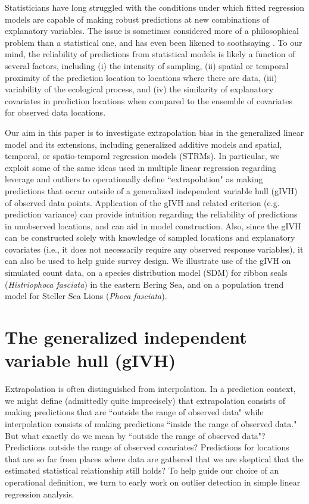 \documentclass[12pt,english]{article}
\begin{document}
\begin{spacing}{1.9}
Statisticians have long struggled with the conditions under which fitted regression models are capable of
making robust predictions at new combinations of explanatory variables.  The issue is sometimes considered more of a
philosophical problem than a statistical one, and has even been likened to soothsaying \citep{EhrenbergBound1993}.  To our mind, the reliability of predictions from statistical models is likely a function of several factors, including (i) the intensity of sampling,
(ii) spatial or temporal proximity of the prediction location to locations where there are data, (iii) variability of the ecological process, and (iv) the similarity of explanatory covariates in prediction locations when compared to the ensemble of covariates for observed data locations.

Our aim in this paper is to investigate extrapolation bias in the generalized linear model and its extensions, including generalized additive models \citep[GAMs;][]{HastieTibshirani1999,Wood2006} and spatial, temporal, or spatio-temporal regression models (STRMs).  In particular, we exploit some of the same ideas used in multiple linear regression regarding leverage and outliers \citep{Cook1979} to operationally define ``extrapolation" as making predictions that occur outside of a generalized independent variable hull (gIVH) of observed data points. Application of the gIVH and related criterion (e.g. prediction variance) can provide intuition regarding the reliability of predictions in unobserved locations, and can aid in model construction.  Also, since the gIVH can be constructed solely with knowledge of sampled locations and explanatory covariates (i.e., it does not necessarily require any observed response variables), it can also be used to help guide survey design. We illustrate use of the gIVH on simulated count data, on a species distribution model (SDM) for ribbon seals ({\it Histriophoca fasciata}) in the eastern Bering Sea, and on a population trend model for Steller Sea Lions ({\it Phoca fasciata}).

\section{The generalized independent variable hull (gIVH)}

Extrapolation is often distinguished from interpolation.  In a prediction context, we might define (admittedly quite imprecisely) that extrapolation consists of making predictions that are ``outside the range of observed data" while interpolation consists of making predictions ``inside the range of observed data."  But what exactly do we mean by ``outside the range of observed data"?  Predictions outside the range of observed covariates?  Predictions for locations that are so far from places where data are gathered that we are skeptical that the estimated statistical relationship still holds? To help guide our choice of an operational definition, we turn to early work on outlier detection in simple linear regression analysis.


\end{spacing}
\end{document}
